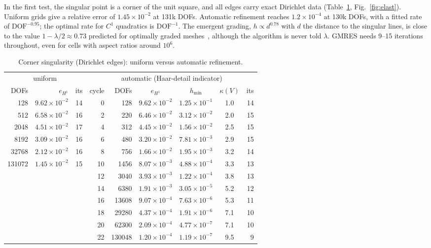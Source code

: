\documentclass[preprint,12pt]{elsarticle}
\theoremstyle{remark}
\begin{document}
In the first test, the singular point is a corner of the unit square, and all edges carry exact
Dirichlet data (Table~\ref{tab:sing}, Fig.~\ref{fig:elast}). Uniform grids give a relative error of
$1.45\times10^{-2}$ at 131k DOFs. Automatic refinement reaches $1.2\times10^{-4}$ at 130k DOFs, with a
fitted rate of $\mathrm{DOF}^{-0.95}$; the optimal rate for $C^1$ quadratics is $\mathrm{DOF}^{-1}$.
The emergent grading, $h\propto d^{0.78}$ with $d$ the distance to the singular lines, is close to the
value $1-\lambda/2\approx0.73$ predicted for optimally graded meshes~\cite{babuska1979direct,apel1999anisotropic},
although the algorithm is never told $\lambda$. GMRES needs 9--15 iterations throughout, even for cells
with aspect ratios around $10^6$.

\begin{table}[t]\centering\footnotesize
\caption{Corner singularity (Dirichlet edges): uniform versus automatic refinement.}\label{tab:sing}
\begin{tabular}{rrc rrcccr}
\toprule
\multicolumn{3}{c}{uniform} & \multicolumn{6}{c}{automatic (Haar-detail indicator)}\\
\cmidrule(lr){1-3}\cmidrule(lr){4-9}
DOFs & $e_{H^1}$ & its & cycle & DOFs & $e_{H^1}$ & $h_{\min}$ & $\kappa(V)$ & its\\
\midrule
128 & $9.62\times10^{-2}$ & 14 & 0 & 128 & $9.62\times10^{-2}$ & $1.25\times10^{-1}$ & 1.0 & 14\\
512 & $6.58\times10^{-2}$ & 16 & 2 & 220 & $6.46\times10^{-2}$ & $3.12\times10^{-2}$ & 2.0 & 15\\
2048 & $4.51\times10^{-2}$ & 17 & 4 & 312 & $4.45\times10^{-2}$ & $1.56\times10^{-2}$ & 2.5 & 15\\
8192 & $3.09\times10^{-2}$ & 16 & 6 & 480 & $3.20\times10^{-2}$ & $7.81\times10^{-3}$ & 2.9 & 15\\
32768 & $2.12\times10^{-2}$ & 16 & 8 & 756 & $1.66\times10^{-2}$ & $1.95\times10^{-3}$ & 3.2 & 14\\
131072 & $1.45\times10^{-2}$ & 15 & 10 & 1456 & $8.07\times10^{-3}$ & $4.88\times10^{-4}$ & 3.3 & 13\\
& & & 12 & 3040 & $3.93\times10^{-3}$ & $1.22\times10^{-4}$ & 3.8 & 13\\
& & & 14 & 6380 & $1.91\times10^{-3}$ & $3.05\times10^{-5}$ & 5.2 & 12\\
& & & 16 & 13608 & $9.07\times10^{-4}$ & $7.63\times10^{-6}$ & 5.3 & 11\\
& & & 18 & 29280 & $4.37\times10^{-4}$ & $1.91\times10^{-6}$ & 7.1 & 10\\
& & & 20 & 62300 & $2.09\times10^{-4}$ & $4.77\times10^{-7}$ & 7.1 & 10\\
& & & 22 & 130048 & $1.20\times10^{-4}$ & $1.19\times10^{-7}$ & 9.5 & 9\\
\bottomrule
\end{tabular}
\end{table}
\end{document}
